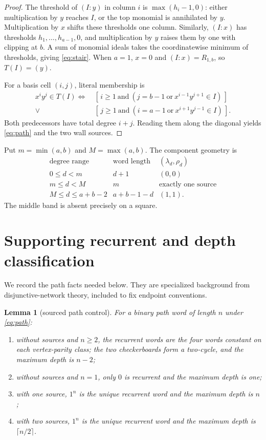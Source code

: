 \documentclass[10pt,a4paper]{amsart}
\newtheorem{lemma}[theorem]{Lemma}
\theoremstyle{definition}
\theoremstyle{remark}
\begin{document}
\begin{proof}
The threshold of \((I:y)\) in column \(i\) is
\(\max(h_i-1,0)\): either multiplication by \(y\) reaches \(I\), or the top
monomial is annihilated by \(y\).  Multiplication by \(x\) shifts these
thresholds one column.  Similarly, \((I:x)\) has thresholds
\(h_1,\ldots,h_{a-1},0\), and multiplication by \(y\) raises them by one
with clipping at \(b\).  A sum of monomial ideals takes the coordinatewise
minimum of thresholds, giving \eqref{eq:stair}.  When \(a=1\), \(x=0\) and
\((I:x)=R_{1,b}\), so \(T(I)=(y)\).

For a basis cell \((i,j)\), literal membership is
\[
\begin{split}
x^iy^j\in T(I)\Longleftrightarrow\
&[\,i\geq1\ \text{and}\ (j=b-1\ \text{or}\ x^{i-1}y^{j+1}\in I)\,]\\
{}\vee{}&
[\,j\geq1\ \text{and}\ (i=a-1\ \text{or}\ x^{i+1}y^{j-1}\in I)\,].
\end{split}                                               \tag{2.5}
\]
Both predecessors have total degree \(i+j\).  Reading them along the
diagonal yields \eqref{eq:path} and the two wall sources.
\end{proof}

Put \(m=\min(a,b)\) and \(M=\max(a,b)\).  The component geometry is
\[
\begin{array}{c|c|c}
\text{degree range}&\text{word length}&(\lambda_d,\rho_d)\\ \hline
0\leq d<m&d+1&(0,0)\\
m\leq d<M&m&\text{exactly one source}\\
M\leq d\leq a+b-2&a+b-1-d&(1,1).
\end{array}                                               \tag{2.6}\label{eq:bands}
\]
The middle band is absent precisely on a square.

\section{Supporting recurrent and depth classification}

We record the path facts needed below.  They are specialized background from
disjunctive-network theory, included to fix endpoint conventions.

\begin{lemma}[sourced path control]\label{lem:path}
For a binary path word of length \(n\) under \eqref{eq:path}:
\begin{enumerate}[label=\textup{(\alph*)}]
\item without sources and \(n\geq2\), the recurrent words are the four words
      constant on each vertex-parity class; the two checkerboards form a
      two-cycle, and the maximum depth is \(n-2\);
\item without sources and \(n=1\), only \(0\) is recurrent and the maximum
      depth is one;
\item with one source, \(1^n\) is the unique recurrent word and the maximum
      depth is \(n\);
\item with two sources, \(1^n\) is the unique recurrent word and the maximum
      depth is \(\lceil n/2\rceil\).
\end{enumerate}
\end{lemma}
\end{document}
